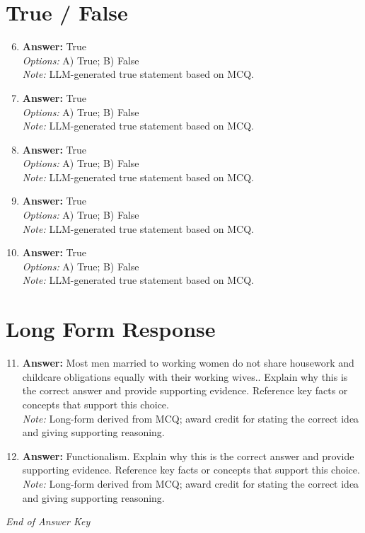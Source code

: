\documentclass[12pt]{article}
\begin{document}
\section*{True / False}
\begin{enumerate}[label=\arabic*.]
\setcounter{enumi}{5}
\item \textbf{Answer:} True
\\ \textit{Options:} A) True; B) False
\\ \textit{Note:} LLM-generated true statement based on MCQ.
\item \textbf{Answer:} True
\\ \textit{Options:} A) True; B) False
\\ \textit{Note:} LLM-generated true statement based on MCQ.
\item \textbf{Answer:} True
\\ \textit{Options:} A) True; B) False
\\ \textit{Note:} LLM-generated true statement based on MCQ.
\item \textbf{Answer:} True
\\ \textit{Options:} A) True; B) False
\\ \textit{Note:} LLM-generated true statement based on MCQ.
\item \textbf{Answer:} True
\\ \textit{Options:} A) True; B) False
\\ \textit{Note:} LLM-generated true statement based on MCQ.
\end{enumerate}

\section*{Long Form Response}
\begin{enumerate}[label=\arabic*.]
\setcounter{enumi}{10}
\item \textbf{Answer:} Most men married to working women do not share housework and childcare obligations equally with their working wives.. Explain why this is the correct answer and provide supporting evidence. Reference key facts or concepts that support this choice.
\\ \textit{Note:} Long-form derived from MCQ; award credit for stating the correct idea and giving supporting reasoning.
\item \textbf{Answer:} Functionalism. Explain why this is the correct answer and provide supporting evidence. Reference key facts or concepts that support this choice.
\\ \textit{Note:} Long-form derived from MCQ; award credit for stating the correct idea and giving supporting reasoning.
\end{enumerate}

\vfill
\noindent\textit{End of Answer Key}
\end{document}
